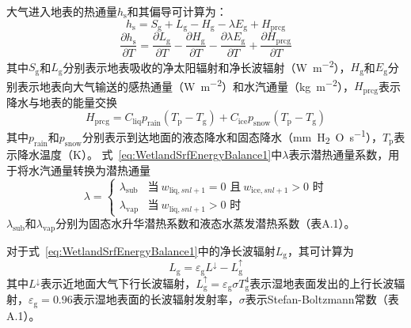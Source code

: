 大气进入地表的热通量$h_{\mathrm {s}} $和其偏导可计算为：
\begin{equation}\label{eq:WetlandSrfEnergyBalance1}
  h_{\mathrm {s}}  = S_{\mathrm {g}}  + L_{\mathrm {g}}  - H_{\mathrm {g}}  - \lambda E_{\mathrm {g}}  + H_{\mathrm{prcg}}
\end{equation}
\begin{equation}
  \frac{\partial h_{\mathrm {s}} }{\partial T} = \frac{\partial L_{\mathrm {g}} }{\partial T} -\frac{\partial H_{\mathrm {g}} }{\partial T} -\frac{\partial \lambda E_{\mathrm {g}} }{\partial T} +\frac{\partial H_{\mathrm{prcg}}}{\partial T}
\end{equation}
其中$S_{\mathrm {g}} $和$L_{\mathrm {g}} $分别表示地表吸收的净太阳辐射和净长波辐射（\unit{W.m^{-2}}），$H_{\mathrm {g}} $和$E_{\mathrm {g}} $分别表示地表向大气输送的感热通量（\unit{W.m^{-2}}）和水汽通量（\unit{kg.m^{-2}}），$H_{\mathrm{prcg}}$表示降水与地表的能量交换
\begin{equation}
  H_{\mathrm{prcg}} = C_{\mathrm{liq}}p_{\mathrm {rain}} \left(T_{\mathrm {p}} -T_{\mathrm {g}} \right) + C_{\mathrm{ice}}p_{\mathrm {snow}} \left(T_{\mathrm {p}} -T_{\mathrm {g}} \right)
\end{equation}
其中$p_{\mathrm {rain}} $和$p_{\mathrm {snow}} $分别表示到达地面的液态降水和固态降水（\unit{mm.H_2O.s^{-1}}），$T_{\mathrm {p}} $表示降水温度（K）。
式~\eqref{eq:WetlandSrfEnergyBalance1}中$\lambda$表示潜热通量系数，用于将水汽通量转换为潜热通量
\begin{equation}
  \lambda = \begin{cases}
    \lambda_{\mathrm {sub}}  &\text{当}\ w_{\mathrm{liq},snl+1}=0\text{ 且}\ w_{\mathrm{ice},snl+1}>0\text{ 时}\\
    \lambda_{\mathrm {vap}}  &\text{当}\ w_{\mathrm{liq},snl+1}>0\text{ 时}
  \end{cases}
\end{equation}
$\lambda_{\mathrm {sub}} $和$\lambda_{\mathrm {vap}} $分别为固态水升华潜热系数和液态水蒸发潜热系数（表A.1）。

对于式~\eqref{eq:WetlandSrfEnergyBalance1}中的净长波辐射$L_{\mathrm {g}} $，其可计算为
\begin{equation}
  L_{\mathrm {g}}  = \varepsilon_{\mathrm {g}}  L ^\downarrow - L_{\mathrm {g}} ^ \uparrow
\end{equation}
其中$L ^\downarrow$表示近地面大气下行长波辐射，$L_{\mathrm {g}} ^\uparrow=\varepsilon_{\mathrm {g}} \sigma T^4_{\mathrm {g}} $表示湿地表面发出的上行长波辐射，$\varepsilon_{\mathrm {g}} =0.96$表示湿地表面的长波辐射发射率，$\sigma$表示Stefan-Boltzmann常数（表A.1）。

